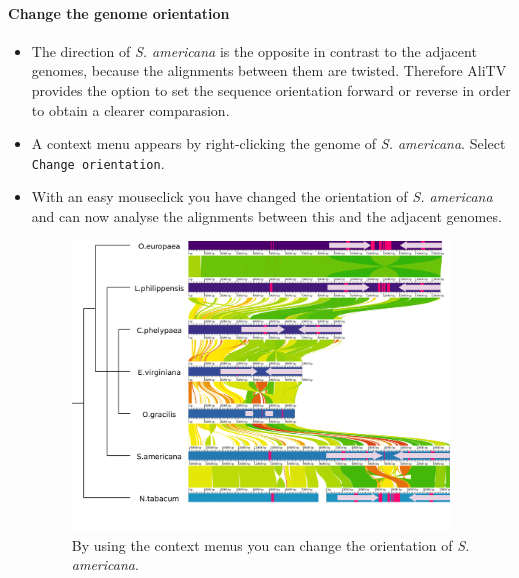 \documentclass[a4paper]{scrartcl}
\begin{document}
\paragraph*{Change the genome orientation}
\begin{itemize}
	\item The direction of \emph{S. americana} is the opposite in contrast to the adjacent genomes, because the alignments between them are twisted. Therefore AliTV provides the option to set the sequence orientation forward or reverse in order to obtain a clearer comparasion. 
	\item A context menu appears by right-clicking the genome of \emph{S. americana}. Select \texttt{Change orientation}.
	\item With an easy mouseclick you have changed the orientation of \emph{S. americana} and can now analyse the alignments between this and the adjacent genomes.
	\begin{figure}[H]
		\centering
		\includegraphics[width=10cm]{reverse.png}
		\caption{By using the context menus you can change the orientation of \emph{S. americana}.}
	\end{figure}
\end{itemize}
	
\end{document}
